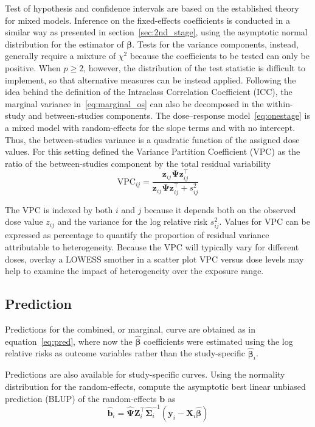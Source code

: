\documentclass[11pt,a4paper,twoside,openany]{book}\usepackage{knitr}
\begin{document}
{Test of hypothesis and confidence intervals are based on the established theory for mixed models. Inference on the fixed-effects coefficients is conducted in a similar way as presented in section~\ref{sec:2nd_stage}, using the asymptotic normal distribution for the estimator of $\boldsymbol{\beta}$. Tests for the variance components, instead, generally require a mixture of $\chi^2$ because the coefficients to be tested can only be positive. When $p \ge 2$, however, the distribution of the test statistic is difficult to implement, so that alternative measures can be instead applied. Following the idea behind the definition of the Intraclass Correlation Coefficient (ICC), the marginal variance in~\ref{eq:marginal_os} can also be decomposed in the within-study and between-studies components. The dose--response model~\ref{eq:onestage} is a mixed model with random-effects for the slope terms and with no intercept. Thus, the between-studies variance is a quadratic function of the assigned dose values. For this setting \cite{goldstein2002partitioning} defined the Variance Partition Coefficient (VPC) as the ratio of the between-studies component by the total residual variability
\begin{equation}
\textrm{VPC}_{ij} = \frac{\mathbf{z}_{ij} \boldsymbol{\Psi} \mathbf{z}_{ij}^\top}{\mathbf{z}_{ij} \boldsymbol{\Psi} \mathbf{z}_{ij}^\top  + s_{ij}^2}
\label{eq:vpc}
\end{equation}

\noindent The VPC is indexed by both $i$ and $j$ because it depends both on the observed dose value $z_{ij}$ and the variance for the log relative risk $s_{ij}^2$. Values for VPC can be expressed as percentage to quantify the proportion of residual variance attributable to heterogeneity. Because the VPC will typically vary for different doses, overlay a LOWESS smother in a scatter plot VPC versus dose levels may help to examine the impact of heterogeneity over the exposure range.

\subsection{Prediction}

Predictions for the combined, or marginal, curve are obtained as in equation~\ref{eq:pred}, where now the $\boldsymbol{\hat \beta}$ coefficients were estimated using the log relative risks as outcome variables rather than the study-specific $\boldsymbol{\hat \beta}_i$. 

\noindent Predictions are also available for study-specific curves. Using the normality distribution for the random-effects, \cite{henderson1959estimation} compute the asymptotic best linear unbiased prediction (BLUP) of the random-effects $\boldsymbol{b}$ as
\begin{equation}
\hat {\mathbf{b}}_i = \hat{\boldsymbol{\Psi}} \mathbf{Z}_i^\top \hat{\boldsymbol{\Sigma}}_i^{-1}\left( \mathbf{y}_i - \mathbf{X}_i\hat{\boldsymbol{\beta}} \right)
\label{eq:blup_os}
\end{equation}

}
\end{document}
